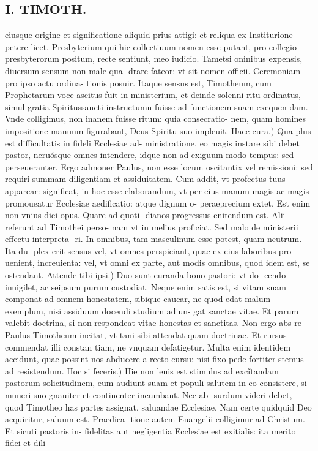 \documentclass{article}
\begin{document}
\begin{pages}
\section*{I. TIMOTH. }
\marginpar{[ p.54 ]}\pstart eiusque origine et significatione aliquid prius attigi: et reliqua ex Institurione petere licet. Presbyterium qui hic collectiuum nomen esse putant, pro collegio presbyterorum positum, recte sentiunt, meo iudicio. Tametsi oninibus expensis, diuersum sensum non male qua- drare fateor: vt sit nomen officii. Ceremoniam pro ipso actu ordina- tionis posuir. Itaque sensus est, Timotheum, cum Prophetarum voce ascitus fuit in ministerium, et deinde solenni ritu ordinatus, simul gratia Spiritussancti instructumn fuisse ad functionem suam exequen dam. Vnde colligimus, non inanem fuisse ritum: quia consecratio- nem, quam homines impositione manuum figurabant, Deus Spiritu suo impleuit.  \pend\pstart Haec cura.) Qua plus est difficultatis in fideli Ecclesiae ad- ministratione, eo magis instare sibi debet pastor, neruósque omnes intendere, idque non ad exiguum modo tempus: sed perseueranter. Ergo admoner Paulus, non esse locum oscitantix vel remissioni: sed requiri summam diligentiam et assiduitatem. Cum addit, vt profectus tuus apparear: significat, in hoc esse elaborandum, vt per eius manum magis ac magis promoueatur Ecclesiae aedificatio: atque dignum o- peraeprecium extet. Est enim non vnius diei opus. Quare ad quoti- dianos progressus enitendum est. Alii referunt ad Timothei perso- nam vt in melius proficiat. Sed malo de ministerii effectu interpreta- ri. In omnibus, tam masculinum esse potest, quam neutrum. Ita du- plex erit sensus vel, vt omnes perspiciant, quae ex eius laboribus pro- uenient, increuienta: vel, vt omni ex parte, aut modis omnibus, quod idem est, se ostendant.  \pend\pstart Attende tibi ipsi.) Duo sunt curanda bono pastori: vt do- cendo inuigilet, ac seipsum purum custodiat. Neque enim satis est, si vitam suam componat ad omnem honestatem, sibique cauear, ne quod edat malum exemplum, nisi assiduum docendi studium adiun- gat sanctae vitae. Et parum valebit doctrina, si non respondeat vitae honestas et sanctitas. Non ergo abs re Paulus Timotheum incitat, vt tani sibi attendat quam doctrinae. Et rursus commendat illi constan tiam, ne vnquam defatigetur. Multa enim identidem accidunt, quae possint nos abducere a recto cursu: nisi fixo pede fortiter stemus ad resistendum.  \pend\pstart Hoc si feceris.) Hie non leuis est stimulus ad excĩtandam pastorum solicitudinem, eum audiunt suam et populi salutem in eo consistere, si muneri suo gnauiter et continenter incumbant. Nec ab- surdum videri debet, quod Timotheo has partes assignat, saluandae Ecclesiae. Nam certe quidquid Deo acquiritur, saluum est. Praedica- tione autem Euangelii colligimur ad Christum. Et sicuti pastoris in- fidelitas aut negligentia Ecclesiae est exitialis: ita merito fidei et dili-  \pend

\end{pages}
\end{document}
